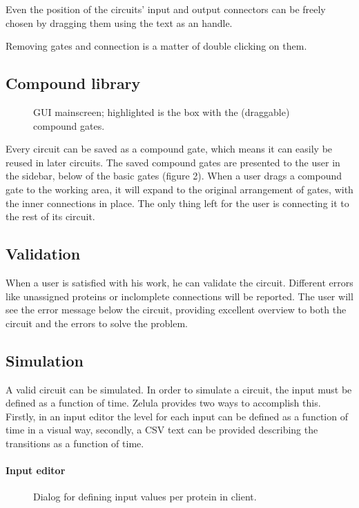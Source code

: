 Even the position of the circuits' input and output connectors can be freely chosen by dragging them using the text as an handle.

Removing gates and connection is a matter of double clicking on them.

\newpage
\subsection{Compound library}
\begin{figure}[h!]
\centering{}
\caption{GUI mainscreen; highlighted is the box with the (draggable) compound gates.}
\end{figure}

\noindent Every circuit can be saved as a compound gate, which means it can easily be reused in later circuits. The saved compound gates are presented to the user in the sidebar, below of the basic gates (figure 2). When a user drags a compound gate to the working area, it will expand to the original arrangement of gates, with the inner connections in place. The only thing left for the user is connecting it to the rest of its circuit.

\subsection{Validation}
When a user is satisfied with his work, he can validate the circuit. Different errors like unassigned proteins or inclomplete connections will be reported. The user will see the error message below the circuit, providing excellent overview to both the circuit and the errors to solve the problem.

\subsection{Simulation}
A valid circuit can be simulated. In order to simulate a circuit, the input must be defined as a function of time. Zelula provides two ways to accomplish this. Firstly, in an input editor the level for each input can be defined as a function of time in a visual way, secondly, a CSV text can be provided describing the transitions as a function of time.

\paragraph{Input editor}
\begin{figure}[h!]
\centering{}
\caption{Dialog for defining input values per protein in client.}
\end{figure}

